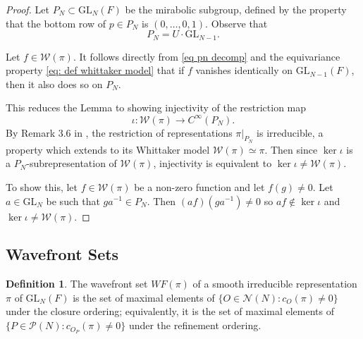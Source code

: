 \documentclass{amsart}
\newcommand{\mc}[1]{\mathcal{#1}}
\newcommand{\GL}{\mathrm{GL}}
\newcommand{\1}{\m 1}
\newtheorem{thm}{Theorem}[subsection]
\theoremstyle{remark}
\theoremstyle{definition}
\newtheorem{dfn}[thm]{Definition}
\numberwithin{equation}{subsection}
\newcommand{\red}[1]{\textcolor{red}{#1}}
\begin{document}
\begin{proof}
Let $P_N \subset \GL_N(F)$ be the mirabolic subgroup, defined by the property that the bottom row of $p \in P_N$ is $(0, \dotsc, 0 ,1)$. Observe that 
\begin{equation} \label{eq pn decomp}
   P_N = U\cdot \GL_{N-1}. 
\end{equation}


Let $f \in \mc W(\pi)$. It follows  directly from \eqref{eq pn decomp} and the equivariance property \eqref{eq: def whittaker model} that if $f$ vanishes identically on $\GL_{N-1}(F)$, then it also does so on $P_N$.

This reduces the Lemma to showing injectivity of the restriction map
\[ 
\iota: \mc W(\pi) \to C^\infty(P_N). 
\] 
By Remark 3.6 in \cite{Zel80},  the restriction of representations $\pi|_{P_N}$ is irreducible, a property which extends to its Whittaker model 
$\mc W(\pi) \simeq \pi$. Then since $\ker \iota$ is a $P_N$-subrepresentation of $\mc W(\pi)$, injectivity is equivalent to $\ker \iota \neq \mc W(\pi)$. 

To show this, let $f \in \mc W(\pi)$ be a non-zero function and let $f(g) \neq 0$. Let $a \in \GL_N$ be such that $ga^{-1} \in P_N$. Then $(af)(ga^{-1}) \neq 0$ so $af \not\in \ker \iota$ and $\ker \iota \neq \mc W(\pi)$.
\end{proof}





\subsection{Wavefront Sets} 
\begin{dfn}
The wavefront set $WF(\pi)$ of a smooth irreducible representation $\pi$ of $\GL_N(F)$ is the set of maximal elements of $\{O \in \mc N(N) : c_O(\pi) \neq 0\}$ under the closure ordering; equivalently, it is the set of maximal elements of $\{P \in \mc P(N) : c_{O_P}(\pi) \neq 0\}$ under the refinement ordering. 
\end{dfn}
\end{document}
